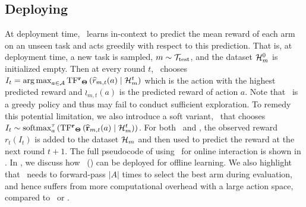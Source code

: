 \documentclass[10pt]{article}
\theoremstyle{plain}
\theoremstyle{definition}
\theoremstyle{remark}
\begin{document}
\subsection{Deploying \pred\ }
\vspace*{-0.5em}
At deployment time, \pred\ learns in-context to predict the mean reward of each arm on an unseen task and acts greedily with respect to this prediction.
That is, at deployment time, a new task is sampled, $m \sim \mathcal{T}_{\text{test}}$, and the dataset $\mathcal{H}_m^0$ is initialized empty. Then at every round $t$,
\pred\ chooses $I_t = \mathop{\rm arg\,max}_{a\in\mathcal{A}} \mathrm{TF^{\mathbf{r}}}_{\mathbf{\Theta}}\left( \widehat{r}_{m,t}(a) \mid \mathcal{H}^t_m\right)$ which is the action with the highest predicted reward and $\wr_{m,t}(a)$ is the predicted reward of action $a$.
Note that \pred\ is a greedy policy and thus may fail to conduct sufficient exploration. To remedy this potential limitation, we also introduce a soft variant, \predt\, that chooses $I_t \sim \mathrm{softmax}^\tau_a\left(\mathrm{TF^{\mathbf{r}}}_{\mathbf{\Theta}}\left( \mathbf{\widehat{r}}_{m,t}(a) \mid \mathcal{H}^t_m\right)\right)$.
For both \pred\ and \predt, the observed reward $r_t(I_t)$ is added to the dataset $\mathcal{H}_m$ and then used to predict the reward at the next round $t+1$. The full pseudocode of using \pred\ for online interaction is shown in .
In , we discuss how \pred\ (\gt) can be deployed for offline learning. We also highlight that \pred\ needs to forward-pass $|A|$ times to select the best arm during evaluation, and hence suffers from more computational overhead with a large action space, compared to \ad\ or \dpt.
\end{document}
